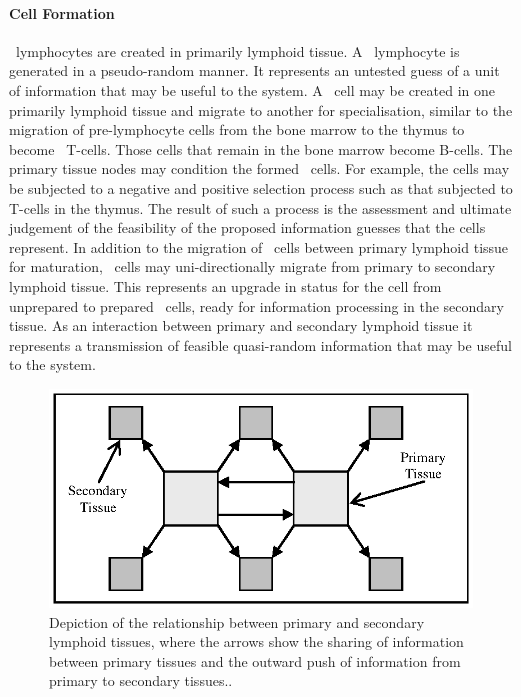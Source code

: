 \paragraph{Cell Formation}
\Naive\ lymphocytes are created in primarily lymphoid tissue. A \naive\ lymphocyte is generated in a pseudo-random manner. It represents an untested guess of a unit of information that may be useful to the system. A \naive\ cell may be created in one primarily lymphoid tissue and migrate to another for specialisation, similar to the migration of pre-lymphocyte cells from the bone marrow to the thymus to become \naive\ T-cells. Those cells that remain in the bone marrow become B-cells. The primary tissue nodes may condition the formed \naive\ cells. For example, the cells may be subjected to a negative and positive selection process such as that subjected to T-cells in the thymus. The result of such a process is the assessment and ultimate judgement of the feasibility of the proposed information guesses that the cells represent. In addition to the migration of \naive\ cells between primary lymphoid tissue for maturation, \naive\ cells may uni-directionally migrate from primary to secondary lymphoid tissue. This represents an upgrade in status for the cell from unprepared to prepared \naive\ cells, ready for information processing in the secondary tissue. As an interaction between primary and secondary lymphoid tissue it represents a transmission of feasible quasi-random information that may be useful to the system.

\begin{figure}[ht]
	\centering
	\includegraphics[scale=0.75]{Tissues/tissues-architectures-formation}
	\caption{Depiction of the relationship between primary and secondary lymphoid tissues, where the arrows show the sharing of information between primary tissues and the outward push of information from primary to secondary tissues..}
	\label{fig:tissues:architecture:formation}
\end{figure}

